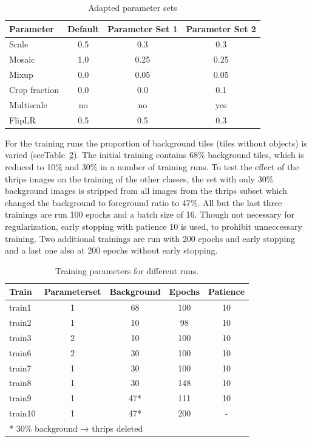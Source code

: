 \documentclass[12pt,a4paper]{article}
\begin{document}
\begin{table}[h]
\centering
\begin{tabular}{lccc}
\hline
\textbf{Parameter} & \textbf{Default} & \textbf{Parameter Set 1} & \textbf{Parameter Set 2} \\
\hline
Scale           & 0.5   & 0.3   & 0.3 \\
Mosaic          & 1.0   & 0.25  & 0.25 \\
Mixup           & 0.0   & 0.05  & 0.05 \\
Crop fraction   & 0.0   & 0.0    & 0.1 \\
Multiscale      & no    & no    & yes \\
FlipLR          & 0.5   & 0.5   & 0.3 \\
\hline
\end{tabular}
\caption{Adapted parameter sets}
\label{tab:paramters-supervised}
\end{table}

For the training runs the proportion of background tiles (tiles without objects) is varied (seeTable~\ref{tab:train_params}). The initial training contains 68\% background tiles, which is reduced to 10\% and 30\% in a number of training runs. To test the effect of the thrips images on the training of the other classes, the set with only 30\% background images is stripped from all images from the thrips subset which changed the background to foreground ratio to 47\%. All but the last three trainings are run 100 epochs and a batch size of 16. Though not necessary for regularization, early stopping with patience 10 is used, to prohibit unneccessary training. Two additional trainings are run with 200 epochs and early stopping and a last one also at 200 epochs without early stopping.

\begin{table}[h!]
\centering
\begin{tabular}{lcccc}
\hline
\textbf{Train} & \textbf{Parameterset} & \textbf{Background} & \textbf{Epochs} & \textbf{Patience} \\
\hline
train1 & 1 & 68 & 100 & 10 \\
train2 & 1 & 10 & 98 & 10 \\
train3 & 2 & 10 & 100 & 10 \\
train6 & 2 & 30 & 100 & 10 \\
train7 & 1 & 30 & 100 & 10 \\
train8 & 1 & 30 & 148 & 10 \\
train9 & 1 & 47* & 111 & 10 \\
train10 & 1 & 47* & 200 & - \\
\hline
\multicolumn{5}{l}{\footnotesize{* 30\% background → thrips deleted}}
\end{tabular}
\caption{Training parameters for different runs.}
\label{tab:train_params}
\end{table}
\end{document}
